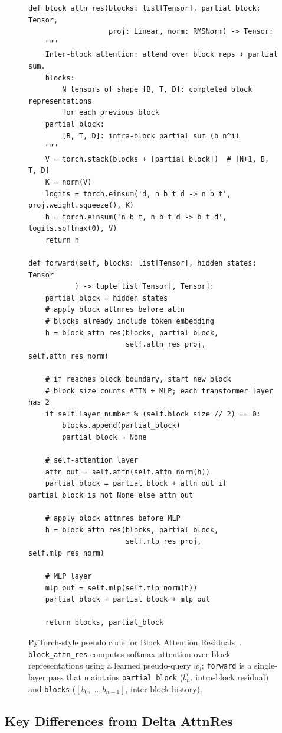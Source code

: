 \documentclass{article}
\begin{document}
\begin{figure}[h]
\begin{lstlisting}[style=python]
def block_attn_res(blocks: list[Tensor], partial_block: Tensor,
                   proj: Linear, norm: RMSNorm) -> Tensor:
    """
    Inter-block attention: attend over block reps + partial sum.
    blocks:
        N tensors of shape [B, T, D]: completed block representations
        for each previous block
    partial_block:
        [B, T, D]: intra-block partial sum (b_n^i)
    """
    V = torch.stack(blocks + [partial_block])  # [N+1, B, T, D]
    K = norm(V)
    logits = torch.einsum('d, n b t d -> n b t', proj.weight.squeeze(), K)
    h = torch.einsum('n b t, n b t d -> b t d', logits.softmax(0), V)
    return h

def forward(self, blocks: list[Tensor], hidden_states: Tensor
           ) -> tuple[list[Tensor], Tensor]:
    partial_block = hidden_states
    # apply block attnres before attn
    # blocks already include token embedding
    h = block_attn_res(blocks, partial_block,
                       self.attn_res_proj, self.attn_res_norm)

    # if reaches block boundary, start new block
    # block_size counts ATTN + MLP; each transformer layer has 2
    if self.layer_number % (self.block_size // 2) == 0:
        blocks.append(partial_block)
        partial_block = None

    # self-attention layer
    attn_out = self.attn(self.attn_norm(h))
    partial_block = partial_block + attn_out if partial_block is not None else attn_out

    # apply block attnres before MLP
    h = block_attn_res(blocks, partial_block,
                       self.mlp_res_proj, self.mlp_res_norm)

    # MLP layer
    mlp_out = self.mlp(self.mlp_norm(h))
    partial_block = partial_block + mlp_out

    return blocks, partial_block
\end{lstlisting}
\caption{PyTorch-style pseudo code for Block Attention Residuals~\citep{kimi2025attention}. \texttt{block\_attn\_res} computes softmax attention over block representations using a learned pseudo-query $w_l$; \texttt{forward} is a single-layer pass that maintains \texttt{partial\_block} ($b_n^i$, intra-block residual) and \texttt{blocks} ($[b_0, \ldots, b_{n-1}]$, inter-block history).}
\label{fig:block_code}
\end{figure}

\subsection{Key Differences from Delta AttnRes}
\end{document}
